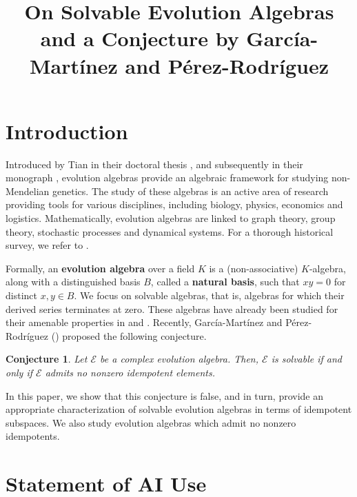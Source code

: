 \documentclass[11pt]{article}
\title[On Solvable Evolution Algebras]{On Solvable Evolution Algebras and a Conjecture by Garc\'ia-Mart\'inez and P\'erez-Rodr\'iguez}
\newtheorem{con}[thm]{Conjecture}
\theoremstyle{definition}
\numberwithin{equation}{section}
\begin{document}
\maketitle



\section{Introduction}

\begin{humanblock}

Introduced by Tian in their doctoral thesis \cite{thesisTian}, and subsequently in their monograph \cite{T08}, evolution algebras provide an algebraic framework for studying non-Mendelian genetics. The study of these algebras is an active area of research providing tools for various disciplines, including biology, physics, economics and logistics. Mathematically, evolution algebras are linked to graph theory, group theory, stochastic processes and dynamical systems. For a thorough historical survey, we refer to \cite{CFNT22}. 

Formally, an \textbf{evolution algebra} over a field $K$ is a (non-associative) $K$-algebra, along with a distinguished basis $B$, called a \textbf{natural basis}, such that $xy = 0$ for distinct $x,y\in B$. We focus on solvable algebras, that is, algebras for which their derived series terminates at zero. These algebras have already been studied for their amenable properties in \cite{FGN22} and \cite{LPP25}. Recently, Garc\'ia-Mart\'inez and P\'erez-Rodr\'iguez (\cite{GP26}) proposed the following conjecture.




\begin{con}\label{theconjecture} Let $\mathcal E$ be a complex evolution algebra. Then, $\mathcal E$ is solvable if and only if $\mathcal E$ admits no nonzero idempotent elements.
\end{con} 

In this paper, we show that this conjecture is false, and in turn, provide an appropriate characterization of solvable evolution algebras in terms of idempotent subspaces. We also study evolution algebras which admit no nonzero idempotents.
\end{humanblock}

\section*{Statement of AI Use}
\end{document}

